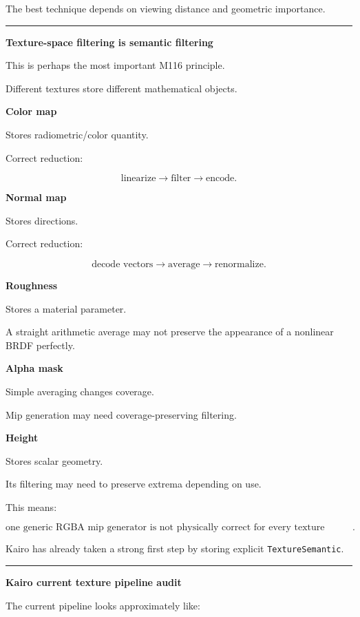 The best technique depends on viewing distance and geometric importance.

\begin{center}\rule{0.5\linewidth}{0.5pt}\end{center}

\textbf{Texture-space filtering is semantic filtering}

This is perhaps the most important M116 principle.

Different textures store different mathematical objects.

\textbf{Color map}

Stores radiometric/color quantity.

Correct reduction:

\[
\text{linearize}
\rightarrow
\text{filter}
\rightarrow
\text{encode}.
\]

\textbf{Normal map}

Stores directions.

Correct reduction:

\[
\text{decode vectors}
\rightarrow
\text{average}
\rightarrow
\text{renormalize}.
\]

\textbf{Roughness}

Stores a material parameter.

A straight arithmetic average may not preserve the appearance of a nonlinear BRDF perfectly.

\textbf{Alpha mask}

Simple averaging changes coverage.

Mip generation may need coverage-preserving filtering.

\textbf{Height}

Stores scalar geometry.

Its filtering may need to preserve extrema depending on use.

This means:

\[
\boxed{
\text{one generic RGBA mip generator is not physically correct for every texture semantic}.
}
\]

Kairo has already taken a strong first step by storing explicit \texttt{TextureSemantic}.

\begin{center}\rule{0.5\linewidth}{0.5pt}\end{center}

\textbf{Kairo current texture pipeline audit}

The current pipeline looks approximately like:

